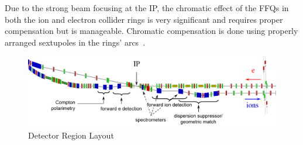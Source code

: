 Due to the strong beam focusing at the IP, the chromatic effect of the FFQs in both the ion and electron collider rings is very significant and requires proper compensation but is manageable. Chromatic compensation is done using properly arranged sextupoles in the rings’ arcs~\cite{Nosochkov:2015}.

\begin{figure}[!htb]
	\centering
	\includegraphics[width=.95\textwidth]{../../img/detector_region_layout}
	\caption{Detector Region Layout}
	\label{fig:detector_region_layout}
\end{figure}
